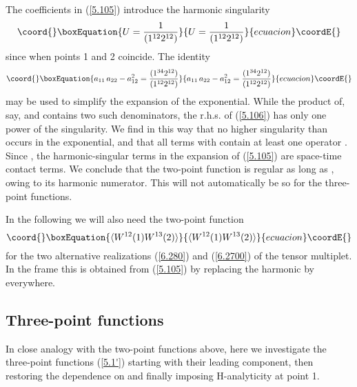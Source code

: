 \documentclass[a4paper,11pt]{article}
\begin{document}
The coefficients \coordHE{} in (\ref{5.105}) introduce the
harmonic singularity
\begin{equation}\coord{}\boxEquation{ \label{5.1055}
U = \frac{1}{(1^{12}2^{12})}
}{ U = \frac{1}{(1^{12}2^{12})}
}{ecuacion}\coordE{}\end{equation}
since \coordHE{} when points 1 and 2 coincide. The identity
\begin{equation}\coord{}\boxEquation{ \label{5.106}
a_{11} \, a_{22} - a_{12}^2 = \frac{(1^{34} 2^{12})}{(1^{12}2^{12})}
}{ a_{11} \, a_{22} - a_{12}^2 = \frac{(1^{34} 2^{12})}{(1^{12}2^{12})}
}{ecuacion}\coordE{}\end{equation}
may be used to simplify the expansion of the exponential. While the product of,
say, \coordHE{} and \coordHE{} contains two such denominators, the r.h.s. of
(\ref{5.106}) has only one power of the singularity. We find in this way that
no higher singularity than \coordHE{} occurs in the exponential, and that all terms
with \coordHE{} contain at least one operator \coordHE{}. Since \coordHE{}, the harmonic-singular terms in the expansion of
(\ref{5.105}) are space-time contact terms. We conclude that the two-point
function is regular as long as \coordHE{}, owing to its harmonic numerator. This
will not automatically be so for the three-point functions.

In the following we will also need the two-point function
\begin{equation}\coord{}\boxEquation{ \label{5.107}
\langle W^{12}(1) W^{13}(2) \rangle
}{ \langle W^{12}(1) W^{13}(2) \rangle
}{ecuacion}\coordE{}\end{equation}
for the two alternative realizations (\ref{6.280}) and (\ref{6.2700}) of the
tensor multiplet. In the frame \coordHE{} this is obtained from (\ref{5.105}) by
replacing the harmonic \coordHE{} by \coordHE{} everywhere.

\subsection{Three-point functions \coordHE{}}

In close analogy with the two-point functions above, here we
investigate the three-point functions (\ref{5.1'}) starting with
their leading component, then restoring the dependence on \myHighlight{$\theta$}\coordHE{}
and finally imposing H-analyticity at point 1.
\end{document}
